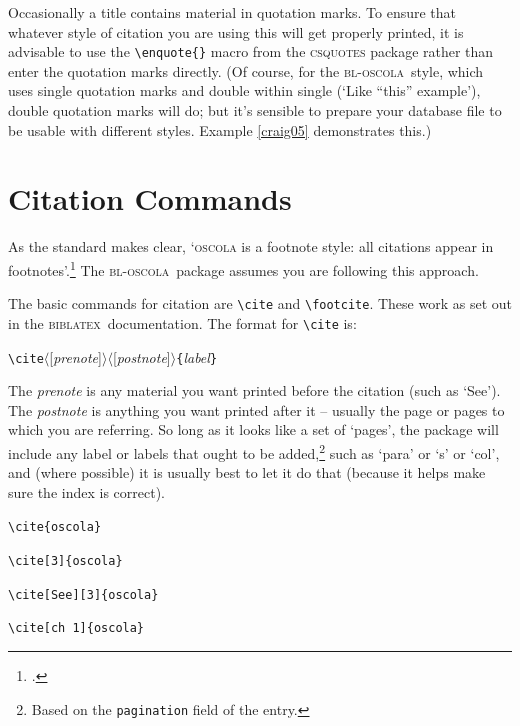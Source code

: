 \documentclass[a4paper,
               11pt,
	       DIV=1,			   
	       footinclude=false]
	      {scrartcl}
\newcommand{\oscola}{\textsc{bl-oscola}}
\newcommand{\biblatex}{\textsc{biblatex}}
\newcommand{\egcite}[1]{{\texttt{\textbackslash cite#1}}}
\begin{document}
Occasionally a title contains material in quotation marks. To ensure
that whatever style of citation you are using this will get properly
printed, it is advisable to use the \verb|\enquote{}| macro from the
\textsc{csquotes} package rather than enter the quotation marks
directly. (Of course, for the \oscola\ style, which uses single
quotation marks and double within single (`Like ``this'' example'),
double quotation marks will do; but it's sensible to prepare your
database file to be usable with different styles. Example
\ref{craig05} demonstrates this.)

\section{Citation Commands}

As the standard makes clear, `\textsc{oscola} is a footnote style: all
citations appear in footnotes'.\footcite[3]{oscola} The \oscola\
package assumes you are following this approach.

The basic commands for citation are \verb|\cite| and
\verb|\footcite|. These work as set out in the \biblatex\
documentation.
\index[general]{cite@\texttt{\textbackslash cite}}
The format for \verb|\cite| is:
\begin{center}
\verb|\cite|$\langle$[\emph{prenote}]$\rangle \langle$[\emph{postnote}]$\rangle$\verb|{|\emph{label}\verb|}|
\end{center}
The \emph{prenote} is any material you want printed before the
citation (such as `See').
The \emph{postnote} is anything you want
printed after it -- usually the page or pages to which you are
referring. So long as it looks like a set of `pages', the package will
include any label or labels that ought to be added,\footnote{Based on the \texttt{pagination} field of the entry.} such as `para' or
`s' or `col', and (where possible) it is usually best to let it do
that (because it helps make sure the index is correct).

\begin{description}
\item[\egcite{\{oscola\}}]          \cite{oscola}
\item[\egcite{[3]\{oscola\}}]       \cite[3]{oscola} 
\item[\egcite{[See][3]\{oscola\}}]  \cite[See][3]{oscola}
\item[\egcite{[ch~1]\{oscola\}}]    \cite[ch~1]{oscola}
\end{description}
\end{document}
